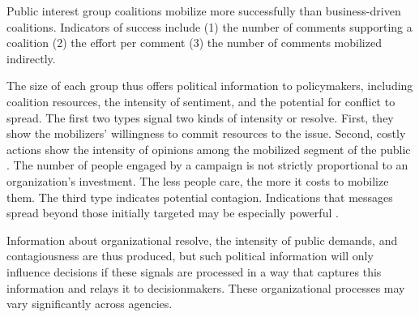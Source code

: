 \begin{subhyp}
\begin{hyp}
Public interest group coalitions mobilize more successfully than business-driven coalitions. Indicators of success include (1) the number of comments supporting a coalition (2) the effort per comment (3) the number of comments mobilized indirectly. 
\end{hyp}

\end{subhyp}

The size of each group thus offers political information to policymakers, including coalition resources, the intensity of sentiment, and the potential for conflict to spread. The first two types signal two kinds of intensity or resolve. First, they show the mobilizers' willingness to commit resources to the issue. Second, costly actions show the intensity of opinions among the mobilized segment of the public \citep{Dunleavy1991}. The number of people engaged by a campaign is not strictly proportional to an organization's investment. The less people care, the more it costs to mobilize them. The third type indicates potential contagion. Indications that messages spread beyond those initially targeted may be especially powerful \citep{Kollman1998}. 

Information about organizational resolve, the intensity of public demands, and contagiousness are thus produced, but %
such political information will only influence decisions if these signals are processed in a way that captures this information and relays it to decisionmakers. These organizational processes may vary significantly across agencies.

